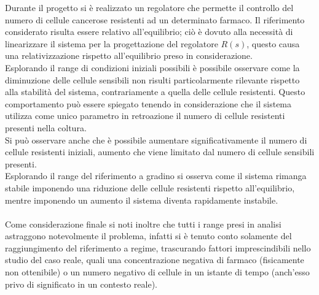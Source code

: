 \documentclass[a4paper, 11pt]{article}
\begin{document}
Durante il progetto si è realizzato un regolatore che permette il controllo del numero di cellule cancerose resistenti ad un determinato farmaco. Il riferimento considerato risulta essere relativo all'equilibrio; ciò è dovuto alla necessità di linearizzare il sistema per la progettazione del regolatore $R(s)$, questo causa una relativizzazione rispetto all'equilibrio preso in considerazione.
\\
Esplorando il range di condizioni iniziali possibili è possibile osservare come la diminuzione delle cellule sensibili non risulti particolarmente rilevante rispetto alla stabilità del sistema, contrariamente a quella delle cellule resistenti. Questo comportamento può essere spiegato tenendo in considerazione che il sistema utilizza come unico parametro in retroazione il numero di cellule resistenti presenti nella coltura.
\\
Si può osservare anche che è possibile aumentare significativamente il numero di cellule resistenti iniziali, aumento che viene limitato dal numero di cellule sensibili presenti.
\\
Esplorando il range del riferimento a gradino si osserva come il sistema rimanga stabile imponendo una riduzione delle cellule resistenti rispetto all'equilibrio, mentre imponendo un aumento il sistema diventa rapidamente instabile.
\\
\\
Come considerazione finale si noti inoltre che tutti i range presi in analisi astraggono notevolmente il problema, infatti si è tenuto conto solamente del raggiungimento del riferimento a regime, trascurando fattori imprescindibili nello studio del caso reale, quali una concentrazione negativa di farmaco (fisicamente non ottenibile) o un numero negativo di cellule in un istante di tempo (anch'esso privo di significato in un contesto reale).
\end{document}
